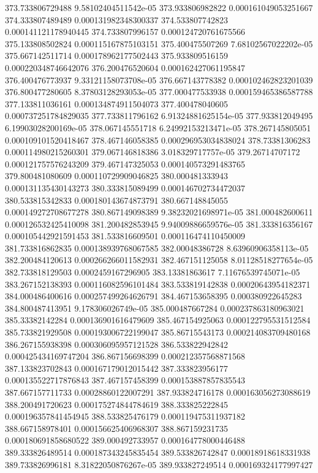 {373.733806729488 9.58102404511542e-05
373.933806982822 0.000161049053251667
374.333807489489 0.000131982348300337
374.533807742823 0.000141121178940445
374.733807996157 0.000124720761675566
375.133808502824 0.000115167875103151
375.400475507269 7.68102567022202e-05
375.667142511714 0.000178962177502443
375.933809516159 0.000220348746642076
376.200476520604 0.000162427061195847
376.400476773937 9.33121158073708e-05
376.667143778382 0.000102462823201039
376.800477280605 8.37803128293053e-05
377.000477533938 0.000159465386587788
377.133811036161 0.000134874911504073
377.400478040605 0.000737251784829035
377.733811796162 6.91324881625154e-05
377.933812049495 6.19903028200169e-05
378.067145551718 6.24992153213471e-05
378.267145805051 0.000109101520418467
378.467146058385 0.000296953034838024
378.73381306283 0.000114980215260301
379.067146818386 3.018329717757e-05
379.26714707172 0.000121757576243209
379.467147325053 0.000140573291483765
379.800481080609 0.000110729909046825
380.000481333943 0.000131135430143273
380.333815089499 0.000146702734472037
380.533815342833 0.000180143674873791
380.667148845055 0.000149272708677278
380.867149098389 9.38232021698971e-05
381.000482600611 0.000126532425410098
381.200482853945 9.94009886659576e-05
381.333816356167 0.000105442921591453
381.533816609501 0.000116474110450009
381.733816862835 0.000138939768067585
382.00048386728 8.63960906358113e-05
382.200484120613 0.000266266011582931
382.467151125058 8.01128518277654e-05
382.733818129503 0.0002459167296905
383.13381863617 7.11676539745071e-05
383.267152138393 0.000116082596101484
383.533819142838 0.00020643954182371
384.000486400616 0.000257499264626791
384.467153658395 0.000380922645283
384.800487413951 9.178306026749e-05
385.000487667284 0.000237863180963021
385.33382142284 0.000136901616479609
385.467154925063 0.000122795531512584
385.733821929508 0.000193006722199047
385.86715543173 0.000214083709480168
386.267155938398 0.000306095957121528
386.533822942842 0.000425434169747204
386.867156698399 0.000212357568871568
387.133823702843 0.000167179012015442
387.333823956177 0.000135522717876843
387.467157458399 0.000153887857835543
387.667157711733 0.00028860122007291
387.933824716178 0.000163056273088619
388.200491720623 0.000175274844784619
388.333825222845 0.000196357841454945
388.533825476179 0.000119475311937182
388.667158978401 0.000156625406968307
388.867159231735 0.000180691858680522
389.000492733957 0.000164778000446488
389.333826489514 0.000187343245835454
389.533826742847 0.00018918618331938
389.733826996181 8.31822050876267e-05
389.933827249514 0.000169324177997427
}

